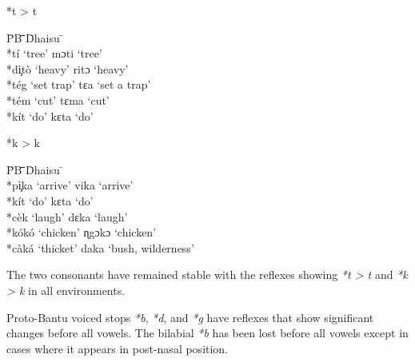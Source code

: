 \documentclass[output=paper,colorlinks,citecolor=brown]{langscibook}
\begin{document}
\ea%
    \label{ex:ngonyani:4}
    *t > t\\
    \begin{tabbing} 
        \= PB \quad\= \quad\= \quad\= \quad\= \quad\= \quad\= \quad\= Dhaisu \quad\=  \quad\= \\
        \>  *tí\>  ‘tree’ \> \> \>  \> \> \>  mɔti \>  ‘tree’\\
        \> *dì̧tò\> ‘heavy’ \> \> \>  \> \> \>  ritɔ \>  ‘heavy’\\
        \>  *tég \> ‘set trap’ \> \> \>  \> \> \>  tɛa \>  ‘set a trap’\\
        \>  *tém \>  ‘cut’ \> \> \>  \> \> \>  tɛma \>  ‘cut’ \\
        \> *kít \> ‘do’ \> \> \>  \> \> \> kɛta \> ‘do’    
    \end{tabbing}
\z

\ea%
    \label{ex:ngonyani:5}
    *k > k\\
    \begin{tabbing} 
        \= PB \quad\= \quad\= \quad\= \quad\= \quad\= \quad\= \quad\= Dhaisu \quad\=  \quad\= \\
        \> *pì̧ka \> ‘arrive’ \> \> \>  \> \> \> vika \> ‘arrive’\\
        \> *kít \> ‘do’ \> \> \>  \> \> \> kɛta \> ‘do’\\
        \> *cèk \> ‘laugh’ \> \> \>  \> \> \> dɛka \> ‘laugh’\\
        \> *kókó \> ‘chicken’ \> \> \>  \> \> \> ɳgɔkɔ \> ‘chicken’\\
        \> *càká \> ‘thicket’\> \> \>  \> \> \> daka \> ‘bush, wilderness’
    \end{tabbing}
\z

The two consonants have remained stable with the reflexes showing \textit{*t > t }and \textit{*k > k } in  all  environments.

Proto-Bantu voiced stops \textit{*b}, \textit{*d}, and \textit{*g} have reflexes that show significant changes before all vowels. The bilabial \textit{*b} has been lost before all vowels except in cases where it appears in post-nasal position.
\end{document}
